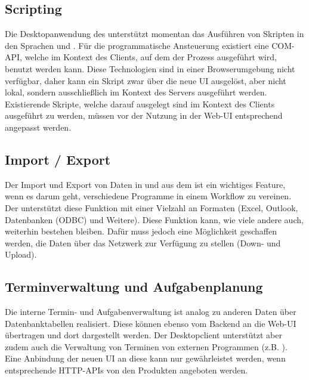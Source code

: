 \subsection{Scripting}
Die Desktopanwendung des  unterstützt momentan das Ausführen von Skripten in den Sprachen  und . Für die programmatische Ansteuerung existiert eine \gls{COM}-API, welche im Kontext des Clients, auf dem der Prozess ausgeführt wird, benutzt werden kann. Diese Technologien sind in einer Browserumgebung nicht verfügbar, daher kann ein Skript zwar über die neue UI ausgelöst, aber nicht lokal, sondern ausschließlich im Kontext des Servers ausgeführt werden. Existierende Skripte, welche darauf ausgelegt sind im Kontext des Clients ausgeführt zu werden, müssen vor der Nutzung in der Web-UI entsprechend angepasst werden.

\subsection{Import / Export}
Der Import und Export von Daten in und aus dem  ist ein wichtiges Feature, wenn es darum geht, verschiedene Programme in einem Workflow zu vereinen. Der  unterstützt diese Funktion mit einer Vielzahl an Formaten (Excel, Outlook, Datenbanken (ODBC) und Weitere). Diese Funktion kann, wie viele andere auch, weiterhin bestehen bleiben. Dafür muss jedoch eine Möglichkeit geschaffen werden, die Daten über das Netzwerk zur Verfügung zu stellen (Down- und Upload).

\subsection{Terminverwaltung und Aufgabenplanung}
Die interne Termin- und Aufgabenverwaltung ist analog zu anderen Daten über Datenbanktabellen realisiert. Diese können ebenso vom Backend an die Web-UI übertragen und dort dargestellt werden. Der Desktopclient unterstützt aber zudem auch die Verwaltung von Terminen von externen Programmen (z.B. ). Eine Anbindung der neuen UI an diese kann nur gewährleistet werden, wenn entsprechende HTTP-APIs von den Produkten angeboten werden.

